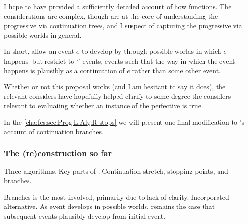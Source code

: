\begin{note}
  I hope to have provided a sufficiently detailed account of how \AlgFindBranches{} functions.
  The considerations are complex, though are at the core of understanding the progressive via continuation trees, and I suspect of capturing the progressive via possible worlds in general.

  In short, allow an event \(e\) to develop by  through possible worlds in which \(e\) happens, but restrict  to `' events, events such that the way in which the event happens is plausibly as a continuation of \(e\) rather than some other event.

  Whether or not this proposal works (and I am hesitant to say it does), the relevant considers have hopefully helped clarify to some degree the considers relevant to evaluating whether an instance of the perfective is true.

  In the \autoref{cha:fcs:sec:Prog:L:Alg:R-stops} we will present one final modification to \citeauthor{Wieland:2013vf}'s account of continuation branches.
\end{note}

\subsubsection{The (re)construction so far}

\begin{note}
  Three algorithms.
  Key parts of \citeauthor{Landman:1992wh}.
  Continuation stretch, stopping points, and branches.

  Branches is the most involved, primarily due to lack of clarity.
  Incorporated alternative.
  As event develops in possible worlds, remains the case that subsequent events plausibly develop from initial event.
\end{note}

